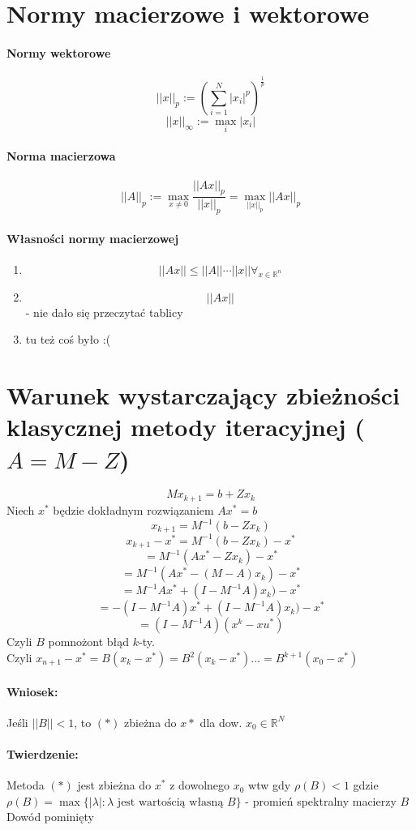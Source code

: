 \documentclass{article}
\begin{document}
\section{Normy macierzowe i wektorowe}
\paragraph{Normy wektorowe}
$$ ||x||_{p}:=(\sum_{i=1}^{N}|x_i|^p)^\frac1p $$
$$ ||x||_\infty:=\max_i |x_i| $$
\paragraph{Norma macierzowa}
$$ ||A||_p := \max_{x\not=0}\frac{||Ax||_p}{||x||_p}=\max_{||x||_p}||Ax||_p $$
\paragraph{Własności normy macierzowej}
\begin{enumerate}
	\item $$||Ax||\leq||A||\dotsm||x|| \forall_{x\in\mathbb{R}^n}$$
	\item $$ ||Ax|| $$ - nie dało się przeczytać tablicy
	\item tu też coś było :(
\end{enumerate}

\section{Warunek wystarczający zbieżności klasycznej metody iteracyjnej ($A=M-Z$)}
\begin{equation}
Mx_{k+1}=b+Zx_k\tag{$*$}
\end{equation}
Niech $x^*$ będzie dokładnym rozwiązaniem $Ax^*=b$
$$x_{k+1}=M^{-1}(b-Zx_k)$$
$$x_{k+1}-x^*=M^{-1}(b-Zx_k)-x^*$$
$$=M^{-1}(Ax^*-Zx_k)-x^*$$
$$=M^{-1}(Ax^*-(M-A)x_k)-x^*$$
$$=M^{-1}Ax^*+(I-M^{-1}A)x_k)-x^*$$
$$=-(I-M^{-1}A)x^*+(I-M^{-1}A)x_k)-x^*$$
$$=(I-M^{-1}A)(x^k-xu^*)$$
Czyli $B$ pomnożont błąd $k$-ty.\\
Czyli $ x_{n+1}-x^*=B(x_k-x^*)=B^2(x_k-x^*)\ldots=B^{k+1}(x_0-x^*) $

\paragraph{Wniosek:} Jeśli $ ||B||<1 $, to $(*)$ zbieżna do $x*$ dla dow. $x_0\in \mathbb{R}^N$

\paragraph{Twierdzenie:} Metoda $ (*) $ jest zbieżna do $ x^* $ z dowolnego $ x_0 $ wtw gdy $ \rho(B)<1 $ 
 gdzie $ \rho(B)=\max\{|\lambda|:\lambda \text{ jest wartością własną }B\} $ - promień spektralny macierzy $ B $
 Dowód pominięty
\end{document}
